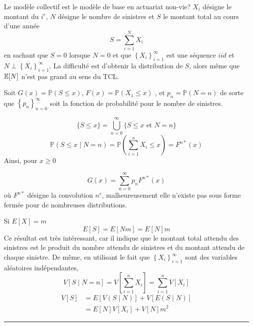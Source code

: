 \begin{f}
Le modèle collectif est le modèle de base en actuariat non-vie?
	 $X_{i}$ désigne le montant du $i^e$, $N$ désigne le nombre de sinistres et $S$ le montant total au cours d'une année
	$$
	S=\sum_{i=1}^{N} X_{i}
	$$
	en sachant que $S=0$ lorsque $N=0 $ et que $\left\{X_{i}\right\}_{i=1}^{\infty}$ est une séquence $iid$ et  $N \perp \left\{X_{i}\right\}_{i=1}^{\infty}$. 
La difficulté est d'obtenir la distribution de $S$, alors même que $\mathbb{E} [N]$ n'est pas grand au sens du TCL.
\end{f}


\begin{f}[La distribution de $S$]
	
Soit $G(x)=\mathbb{P}(S \leq x)$, $F(x)=\mathbb{P}\left(X_{1} \leq x\right)$ , et $p_{n}=\mathbb{P}(N=n)$ de sorte que $\left\{p_{n}\right\}_{n=0}^{\infty}$ soit la fonction de probabilité pour le nombre de sinistres.
	
	$$
	\{S \leq x\}=\bigcup_{n=0}^{\infty}\{S \leq x \text { et } N=n\}
	$$
	$$
	\mathbb{P}(S \leq x \mid N=n)=\mathbb{P}\left(\sum_{i=1}^{n} X_{i} \leq x\right)=F^{n *}(x)
	$$
	Ainsi, pour $x \geq 0$
	
	\begin{equation*}\label{GxCollectif}
		G(x)=\sum_{n=0}^{\infty} p_{n} F^{n *}(x)
	\end{equation*}
	où $F^{n *}$ désigne la convolution $n^e$, malheureusement elle n'existe pas sous forme fermée pour de nombreuses distributions.	
	
Si $E[X]=m$
	$$
	E[S]=E\left[N m\right]=E[N] m
	$$
	Ce résultat est très intéressant, car il indique que le montant total attendu des sinistres est le produit du nombre attendu de sinistres et du montant attendu de chaque sinistre. De même, en utilisant le fait que $\left\{X_{i}\right\}_{i=1}^{\infty}$ sont des variables aléatoires indépendantes,
	$$
	V[S \mid N=n]=V\left[\sum_{i=1}^{n} X_{i}\right]=\sum_{i=1}^{n} V\left[X_{i}\right]
	$$
	$$
	\begin{aligned}
		V[S] &=E[V(S \mid N)]+V[E(S \mid N)] \\
		&=E[N] V\left[X_{i}\right]+V[N] m^{2}
	\end{aligned}
	$$    
\end{f}

\hrule


